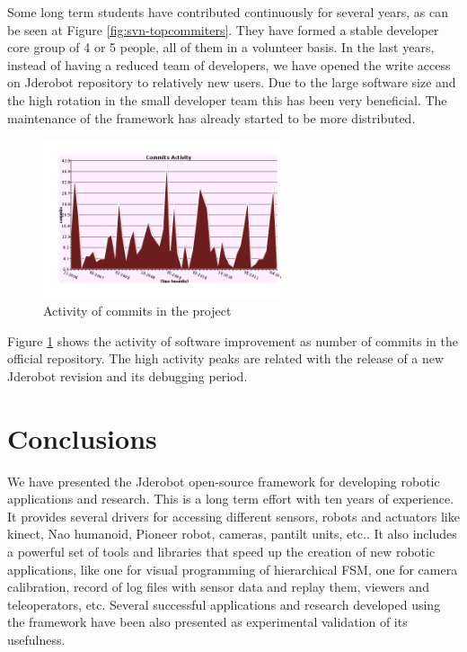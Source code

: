 \documentclass[twocolumn]{svjour3}          %
\begin{document}
Some long term students have contributed continuously for several years, as can be seen at Figure \ref{fig:svn-topcommiters}. They have formed a stable developer core group of 4 or 5 people, all of them in a volunteer basis. In the last years, instead of having a reduced team of developers, we have opened the write access on Jderobot repository to relatively new users. Due to the large software size and the high rotation in the small developer team this has been very beneficial. The maintenance of the framework has already started to be more distributed.

\begin{figure}
  \includegraphics[width=7cm]{figs/svn_activity.png}
\caption{Activity of commits in the project}
\label{fig:svn-activity}
\end{figure}

Figure \ref{fig:svn-activity} shows the activity of software improvement as number of commits in the official repository. The high activity peaks are related with the release of a new Jderobot revision and its debugging period.

\section{Conclusions}

We have presented the Jderobot open-source framework for developing robotic applications and research. This is a long term effort with ten years of experience. It provides several drivers for accessing different sensors, robots and actuators like kinect, Nao humanoid, Pioneer robot, cameras, pantilt units, etc.. It also includes a powerful set of tools and libraries that speed up the creation of new robotic applications, like one for visual programming of hierarchical FSM, one for camera calibration, record of log files with sensor data and replay them, viewers and teleoperators, etc. Several successful applications and research developed using the framework have been also presented as experimental validation of its usefulness.
\end{document}
